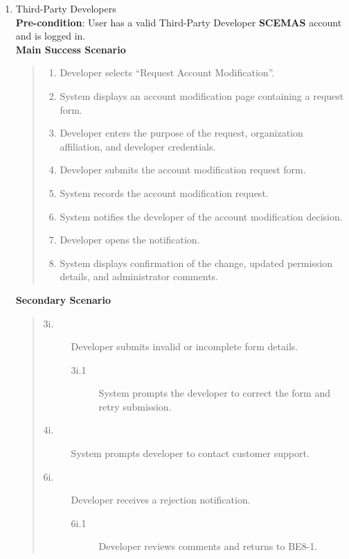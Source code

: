 \documentclass[]{article}
\begin{document}
\begin{enumerate}[{\bf BE8.}]
\begin{enumerate}[{\bf VP1.}]
			\item Third-Party Developers \\
                \textbf{Pre-condition}: User has a valid Third-Party Developer \textbf{SCEMAS} account and is logged in. \\
                \textbf{Main Success Scenario}
                \begin{quote}
                    \begin{enumerate}[1.]
                        \item Developer selects ``Request Account Modification''.
                        \item System displays an account modification page containing a request form.
                        \item Developer enters the purpose of the request, organization affiliation, and developer credentials.
                        \item Developer submits the account modification request form.
                        \item System records the account modification request.
                        \item System notifies the developer of the account modification decision.
                        \item Developer opens the notification.
                        \item System displays confirmation of the change, updated permission details, and administrator comments.
                    \end{enumerate}
                \end{quote}
                \textbf{Secondary Scenario}
                \begin{quote}
                    \begin{description}
                        \item[\textmd{3i.}] Developer submits invalid or incomplete form details.
                        \begin{description}
                            \item[\textmd{3i.1}] System prompts the developer to correct the form and retry submission.
                        \end{description}
                        \item[\textmd{4i.}] System prompts developer to contact customer support.
                        \item[\textmd{6i.}] Developer receives a rejection notification.
                        \begin{description}
                            \item[\textmd{6i.1}] Developer reviews comments and returns to BE8-1.
                        \end{description}
                    \end{description}
                \end{quote}


\end{enumerate}
\end{enumerate}
\end{document}
